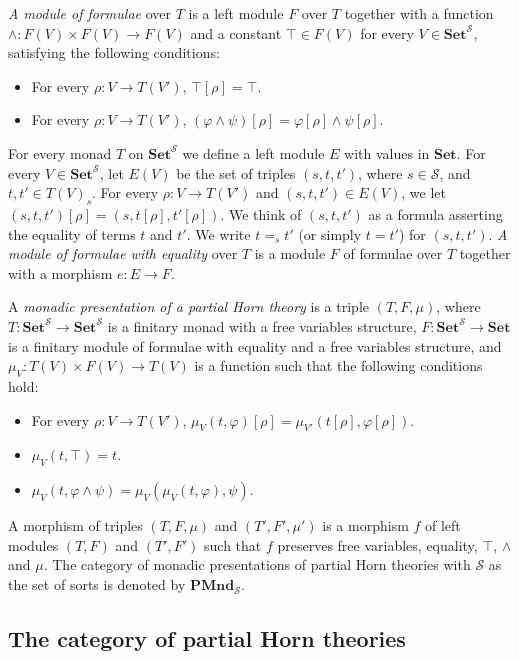 \documentclass{elsarticle}
\theoremstyle{definition}
\theoremstyle{remark}
\newcommand{\cat}[1]{\mathbf{#1}}
\newcommand{\Set}{\cat{Set}}
\newcommand{\PMnd}{\cat{PMnd}}
\numberwithin{figure}{section}
\begin{document}
\emph{A module of formulae} over $T$ is a left module $F$ over $T$ together with a function
    $\land : F(V) \times F(V) \to F(V)$ and a constant $\top \in F(V)$ for every $V \in \Set^\mathcal{S}$, satisfying the following conditions:
\begin{itemize}
\item For every $\rho : V \to T(V')$, $\top[\rho] = \top$.
\item For every $\rho : V \to T(V')$, $(\varphi \land \psi)[\rho] = \varphi[\rho] \land \psi[\rho]$.
\end{itemize}

For every monad $T$ on $\Set^\mathcal{S}$ we define a left module $E$ with values in $\Set$.
For every $V \in \Set^\mathcal{S}$, let $E(V)$ be the set of triples $(s,t,t')$, where $s \in \mathcal{S}$, and $t,t' \in T(V)_s$.
For every $\rho : V \to T(V')$ and $(s,t,t') \in E(V)$, we let $(s,t,t')[\rho] = (s,t[\rho],t'[\rho])$.
We think of $(s,t,t')$ as a formula asserting the equality of terms $t$ and $t'$.
We write $t =_s t'$ (or simply $t = t'$) for $(s,t,t')$.
\emph{A module of formulae with equality} over $T$ is a module $F$ of formulae over $T$ together with a morphism $e : E \to F$.

\begin{defn}
A \emph{monadic presentation of a partial Horn theory} is a triple $(T,F,\mu)$, where
    $T : \Set^\mathcal{S} \to \Set^\mathcal{S}$ is a finitary monad with a free variables structure,
    $F : \Set^\mathcal{S} \to \Set$ is a finitary module of formulae with equality and a free variables structure, and
    $\mu_V : T(V) \times F(V) \to T(V)$ is a function such that the following conditions hold:
\begin{itemize}
\item For every $\rho : V \to T(V')$, $\mu_V(t,\varphi)[\rho] = \mu_{V'}(t[\rho],\varphi[\rho])$.
\item $\mu_V(t, \top) = t$.
\item $\mu_V(t, \varphi \land \psi) = \mu_V(\mu_V(t, \varphi), \psi)$.
\end{itemize}
A morphism of triples $(T,F,\mu)$ and $(T',F',\mu')$ is a morphism $f$ of left modules $(T,F)$ and $(T',F')$ such that $f$ preserves free variables, equality, $\top$, $\land$ and $\mu$.
The category of monadic presentations of partial Horn theories with $\mathcal{S}$ as the set of sorts is denoted by $\PMnd_\mathcal{S}$.
\end{defn}

\subsection{The category of partial Horn theories}
\end{document}
